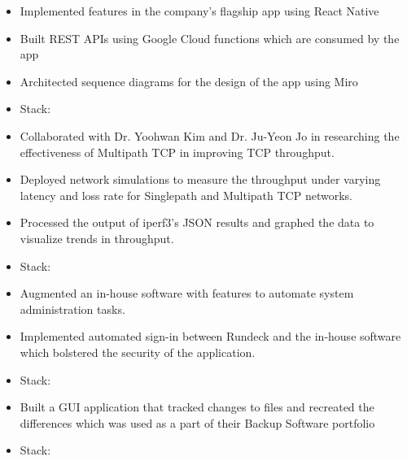     

\begin{itemize}
    \item Implemented features in the company's flagship app using React Native
    \item Built REST APIs using Google Cloud functions which are consumed by the app
    \item Architected sequence diagrams for the design of the app using Miro
    \item Stack:      
\end{itemize}
\divider

\begin{itemize}
    \item Collaborated with Dr. Yoohwan Kim and Dr. Ju-Yeon Jo in researching the effectiveness of Multipath TCP in improving TCP throughput.
    \item Deployed network simulations to measure the throughput under varying latency and loss rate for Singlepath and Multipath TCP networks.
    \item Processed the output of iperf3's JSON results and graphed the data to visualize trends in throughput.
    \item Stack:    
\end{itemize}
\divider

\begin{itemize}
    \item Augmented an in-house software with features to automate system administration tasks.
    \item Implemented automated sign-in between Rundeck and the in-house software which bolstered the security of the application.
    \item Stack:  
\end{itemize}

\divider

\begin{itemize}
    \item Built a GUI application that tracked changes to files and recreated the differences which was used as a part of their Backup Software portfolio 
    \item Stack:   
\end{itemize}

